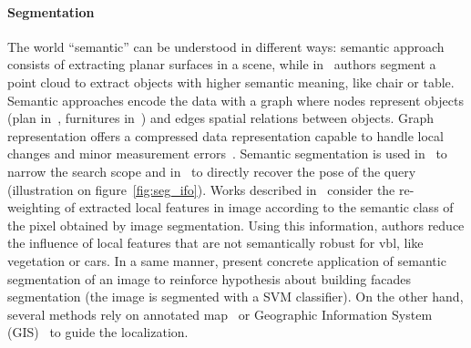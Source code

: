 		\paragraph{Segmentation}
			The world ``semantic'' can be understood in different ways: \citet{Fernandez-Moral2013} semantic approach consists of extracting planar surfaces in a scene, while in~\citep{Salas-Moreno2013} authors segment a point cloud to extract objects with higher semantic meaning, like chair or table. Semantic approaches encode the data with a graph where nodes represent objects (plan in~\citep{Fernandez-Moral2013}, furnitures in~\citep{Salas-Moreno2013}) and edges spatial relations between objects. Graph representation offers a compressed data representation capable to handle local changes and minor measurement errors~\citep{Stumm2015}. Semantic segmentation is used in~\citep{Lu2015} to narrow the search scope and in~\citep{Ardeshir2014,Castaldo2015,Christie2016} to directly recover the pose of the query (illustration on figure~\ref{fig:seg_ifo}). Works described in~\citep{Arandjelovic2014a,Mousavian2015} consider the re-weighting of extracted local features in image according to the semantic class of the pixel obtained by image segmentation. Using this information, authors reduce the influence of local features that are not semantically robust for \ac{vbl}, like vegetation or cars. In a same manner, \citet{Arth2015} present concrete application of semantic segmentation of an image to reinforce hypothesis about building facades segmentation (the image is segmented with a SVM classifier). On the other hand, several methods rely on annotated map~\citep{Atanasov2016,Wang2015} or Geographic Information System (GIS)~\citep{Ardeshir2014,Castaldo2015,Qu2015} to guide the localization.
	    	

